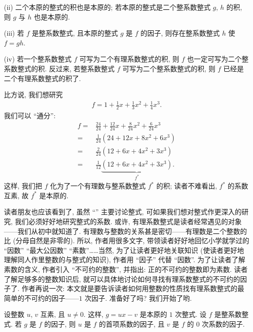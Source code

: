 (ii) 二个本原的整式的积也是本原的; 若本原的整式是二个整系数整式 $g$, $h$ 的积, 则 $g$ 与 $h$ 也是本原的.

(iii) 若 $f$ 是整系数整式, 且本原的整式 $g$ 是 $f$ 的因子, 则存在整系数整式 $h$ 使 $f = gh$.

(iv) 若一个整系数整式 $f$ 可写为二个有理系数整式的积, 则 $f$ 也一定可写为二个整系数整式的积. 反过来, 若整系数整式 $f$ 可写为二个整系数整式的积, 则 $f$ 已经是二个有理系数整式的积了.

比方说, 我们想研究
\begin{align*}
    f = 1 + \frac{1}{2}x + \frac{1}{3}x^2 + \frac{1}{4}x^3.
\end{align*}
我们可以 ``通分'':
\begin{align*}
    f
    = {} & \frac{24}{24} + \frac{12}{24} x + \frac{8}{24} x^2 + \frac{6}{24} x^3 \\
    = {} & \frac{1}{24} (24 + 12x + 8x^2 + 6x^3)                                 \\
    = {} & \frac{2}{24} (12 + 6x + 4x^2 + 3x^3)                                  \\
    = {} & \frac{1}{12} \underbrace{(12 + 6x + 4x^2 + 3x^3)}_{f^{\ast}}.
\end{align*}
这样, 我们把 $f$ 化为了一个有理数与整系数整式 $f^{\ast}$ 的积; 读者不难看出, $f^{\ast}$ 的系数互素, 故 $f^{\ast}$ 是本原的.

读者朋友也应该看到了, 虽然 ``\HEADING'' 主要讨论整式, 可如果我们想对整式作更深入的研究, 我们必须好好地研究整式的系数. 或许, 有理系数整式是读者经常遇见的对象——我们从初中就知道了. 有理数与整数的关系甚是密切——有理数是二个整数的比 (分母自然是非零的). 所以, 作者用很多文字, 带领读者好好地回忆小学就学过的 ``因数'' ``最大公因数'' ``素数''……当然, 为了让读者更好地关联知识 (使读者更好地理解同人作里整数的与整式的知识), 作者用 ``因子'' 代替 ``因数''. 为了让读者了解素数的含义, 作者引入 ``不可约的整数'', 并指出: 正的不可约的整数即为素数. 读者了解足够多的整数知识后, 就可以具体地讨论如何寻找有理系数整式的不可约的因子了. 作者再说一次: 本文就是要告诉读者如何用整数的性质找有理系数整式的最简单的不可约的因子——$1$ 次因子. 准备好了吗? 我们开始了哟.

\begin{proposition}
    设整数 $u$, $v$ 互素, 且 $u \neq 0$. 这样, $g = ux - v$ 是本原的 $1$ 次整式. 设 $f$ 是整系数整式. 若 $g$ 是 $f$ 的因子, 则 $u$ 是 $f$ 的首项系数的因子, 且 $v$ 是 $f$ 的 $0$ 次系数的因子.
\end{proposition}

